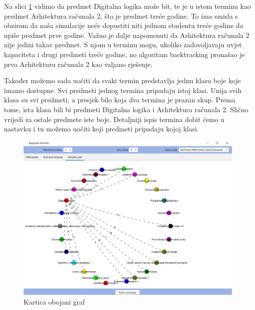 \documentclass[times, utf8, zavrsni, numeric]{fer}
\begin{document}
Na slici \ref{fig:obojani-graf} vidimo da predmet Digitalna logika može bit, te je u istom terminu kao predmet Arhitektura računala 2, što je predmet treće godine. To ima smisla s obzirom da naša simulacije neće dopustiti niti jednom studentu treće godine da upiše predmet prve godine. Važno je dalje napomenuti da Arhitektura računala 2 nije jedini takav predmet. S njom u terminu mogu, ukoliko zadovoljavaju uvjet kapaciteta i drugi predmeti treće godine, no algoritam backtracking pronašao je prvo Arhitekturu računala 2 kao valjano rješenje.\par
Također možemo sada uočiti da svaki termin predstavlja jednu klasu boje koje imamo dostupne. Svi predmeti jednog termina pripadaju istoj klasi. Unija svih klasa su svi predmeti, a presjek bilo koja dva termina je prazan skup. Prema tome, ista klasa bili bi predmeti Digitalna logika i Arhitektura računala 2. Slično vrijedi za ostale predmete iste boje. Detaljniji ispis termina dobit ćemo u nastavku i tu možemo uočiti koji predmeti pripadaju kojoj klasi.

\begin{figure}[h!]
	\centering
	\includegraphics[width=0.9\columnwidth]{slike/obojaniGraf.png}
	\caption{Kartica obojani graf}
	\label{fig:obojani-graf}
\end{figure}
\newpage
\end{document}
